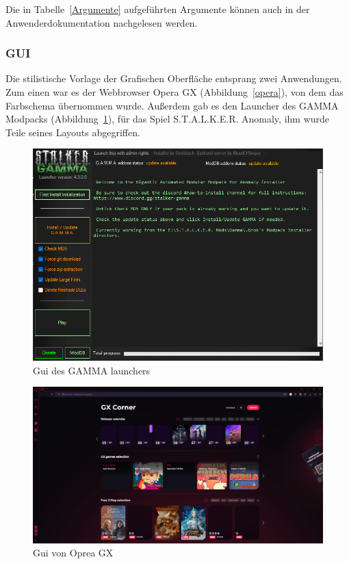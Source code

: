 \documentclass[stu, a4paper, 11pt, floatsintext]{apa7}
\begin{document}
\noindent Die in Tabelle~\ref{Argumente} aufgeführten Argumente können auch in der Anwenderdokumentation nachgelesen werden.

\subsubsection{GUI}
\noindent Die stilistische Vorlage der Grafischen Oberfläche entsprang zwei Anwendungen.
Zum einen war es der Webbrowser Opera GX (Abbildung~\ref{opera}), von dem das Farbschema übernommen wurde.
Außerdem gab es den Launcher des GAMMA Modpacks (Abbildung~\ref{gamma}), für das Spiel S.T.A.L.K.E.R. Anomaly, ihm wurde Teile seines Layouts abgegriffen.

\begin{figure}[!htbp]
\centering
\includegraphics[width=450px]{../technical_documentation/gui_sketches/inspiration/gamma.png}
\caption{\label{gamma}Gui des GAMMA launchers}
\end{figure}

\begin{figure}[!htbp]
\centering
\includegraphics[width=450px]{../technical_documentation/gui_sketches/inspiration/opera.png}
\caption{\label{gx}Gui von Oprea GX}
\end{figure}
\end{document}
